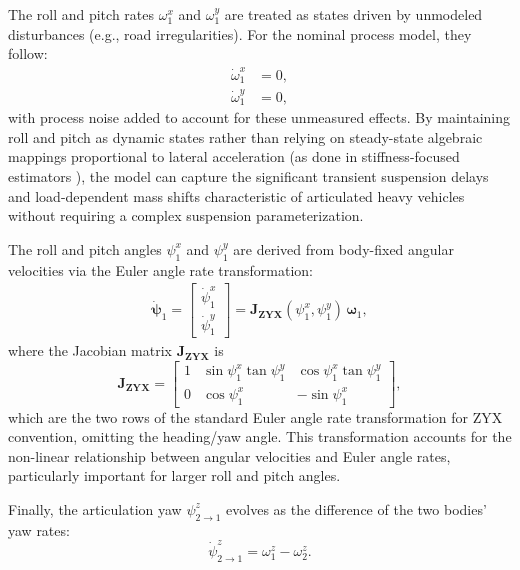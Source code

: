 \documentclass[conference]{IEEEtran}
\begin{document}
The roll and pitch rates $\omega^x_1$ and $\omega^y_1$ are treated as states driven by unmodeled disturbances (e.g., road irregularities). For the nominal process model, they follow:
\begin{align}
\dot\omega^x_1 &= 0, \label{eq:dotOmegaX} \\
\dot\omega^y_1 &= 0, \label{eq:dotOmegaY}
\end{align}
with process noise added to account for these unmeasured effects. By maintaining roll and pitch as dynamic states rather than relying on steady-state algebraic mappings proportional to lateral acceleration (as done in stiffness-focused estimators \cite{berntorp_tire-stiffness_2019}), the model can capture the significant transient suspension delays and load-dependent mass shifts characteristic of articulated heavy vehicles without requiring a complex suspension parameterization.

The roll and pitch angles $\psi^x_1$ and $\psi^y_1$ are derived from body-fixed angular velocities via the Euler angle rate transformation:
\begin{align}
    \dot{\bm\psi}_1 =
    \begin{bmatrix}\dot{\psi}^x_1 \\ 
    \dot{\psi}^y_1 \end{bmatrix} =
\bm{J_{ZYX}}(\psi^x_1, \psi^y_1) \, \bm{\omega}_1, \label{eq:dotpsi}
\end{align}
where the Jacobian matrix $\bm{J_{ZYX}}$ is
\begin{equation}
    \bm{J_{ZYX}} = \begin{bmatrix}
1 & \sin\psi^x_1 \tan\psi^y_1 & \cos\psi^x_1 \tan\psi^y_1 \\
0 & \cos\psi^x_1 & -\sin\psi^x_1
\end{bmatrix},
\end{equation}
which are the two rows of the standard Euler angle rate transformation for ZYX convention, omitting the heading/yaw angle. This transformation accounts for the non-linear relationship between angular velocities and Euler angle rates, particularly important for larger roll and pitch angles.

Finally, the articulation yaw $\psi^z_{2\to1}$ evolves as the difference of the two bodies' yaw rates:
\begin{equation}
    \dot{\psi}^z_{2\to1} = \omega^z_1 - \omega^z_2. \label{eq:dotArticulation}
\end{equation}
\end{document}
